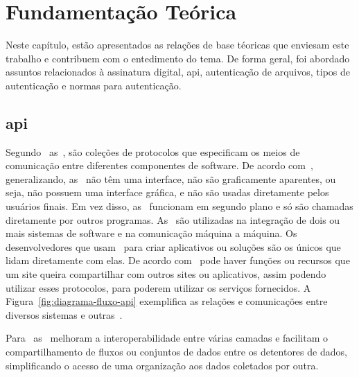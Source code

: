 \chapter{Fundamentação Teórica}\label{ch:fundamentacao-teorica}

Neste capítulo, estão apresentados as relações de base téoricas que
enviesam este trabalho e contribuem com o entedimento do tema.
De forma geral, foi abordado assuntos relacionados à assinatura
digital, \acrfull{api}, autenticação de arquivos, tipos de
autenticação e normas para autenticação.
\section{\acrlong{api}}\label{sec:api}

Segundo~\textcite{borgogno2019} as~,
são coleções de protocolos que especificam os meios de comunicação
entre diferentes componentes de software.
De acordo com~\textcite{biehl2015}, generalizando, as~ não
têm uma interface, não são graficamente aparentes, ou seja, não possuem uma
interface gráfica, e não são usadas diretamente pelos usuários finais.
Em vez disso, as~ funcionam em segundo plano e só são chamadas
diretamente por outros programas.
As~ são utilizadas na integração de dois ou mais sistemas de
software e na comunicação máquina a máquina.
Os desenvolvedores que usam~ para criar aplicativos ou
soluções são os únicos que lidam diretamente com elas.
De acordo com~\textcite{russel2019} pode haver funções ou recursos que um
site queira compartilhar com outros sites ou aplicativos, assim podendo
utilizar esses protocolos, para poderem utilizar os serviços fornecidos.
A Figura~\ref{fig:diagrama-fluxo-api} exemplifica as relações e
comunicações entre diversos sistemas e outras~.

Para~\textcite{borgogno2019} as~ melhoram a
interoperabilidade entre várias camadas e facilitam o compartilhamento de
fluxos ou conjuntos de dados entre os detentores de dados, simplificando o
acesso de uma organização aos dados coletados por outra.

